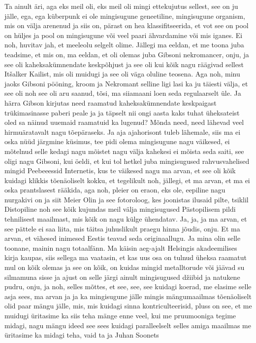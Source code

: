 Ta ainult äri, aga eks meil oli, eks meil oli mingi ettekujutus sellest, see on ju jälle, ega, ega küberpunk ei ole mingisugune geneetiline, mingisugune organism, mis on välja arenenud ja siis on, pärast on hea klassifitseerida, et vot see on pool on hüljes ja pool on mingisugune või veel paari ähvardamine või mis iganes. Ei noh, huvitav jah, et meeleolu selgelt olime. Jällegi ma eeldan, et me toona juba teadsime, et mis on, ma eeldan, et oli olemas juba Gibsoni nekromancer, onju, ja see oli kaheksakümnendate keskpõhjust ja see oli kui kõik nagu räägivad sellest Itšalker Kailist, mis oli muidugi ja see oli väga oluline teosena. Aga noh, minu jaoks Gibsoni pööning, kroom ja Nekromant selline ligi lasi ka ju täiesti välja, et see oli noh see oli aru saanud, tõsi, ma siiamaani loen seda regulaarselt üle. Ja härra Gibson kirjutas need raamatud kaheksakümnendate keskpaigast trükimasinasse paberi peale ja ja täpselt nii ongi aasta kaks tuhat üheksateist oled sa näinud uuemaid raamatuid ka lugenud? Mõnda need, need lähevad veel hirmuäratavalt nagu tõepäraseks. Ja aja ajahorisont tuleb lähemale, siis ma ei oska nüüd järgmine küsimus, tee pidi olema mingisugune nagu väikesed, ei mõtelnud selle kedagi nagu mõistet nagu välja kahekesi ei mõista seda saiti, see oligi nagu Gibsoni, kui öeldi, et kui tol hetkel juba mingisugused rahvusvahelised mingid Peebeeessid Internetis, kus te väikesed nagu ma arvan, et see oli kõik kuidagi klikkis tõenäoliselt kokku, et tegelikult noh, jällegi, et ma arvan, et ma ei oska prantslasest rääkida, aga noh, pleier on eraon, eks ole, eepiline nagu nurgakivi on ja siit Meier Olin ja see fotoroloog, kes joonistas ilusaid pilte, tsiklil Distopiline noh see kõik kujundas meil välja mingisugused Pästopilisem pildi tehnilisest maailmast, mis kõik on nagu külge ühendatav. Ja, ja, ja ma arvan, et see pättele ei saa liita, mis täitsa juhuslikult praegu hinna jõudis, onju. Et ma arvan, et vähesed inimesed Eestis teavad seda originaallugu. Ja mina olin selle toonane, mainin nagu totaalfänn. Ma käisin aeg-ajalt Helsingis akadeemilises kirja kaupas, siis sellega ma vaatasin, et kas uus osa on tulnud üheksa raamatut mul on kõik olemas ja see on kõik, on kuidas mingid metalltorude või jäävad su silmamuna sisse ja ajust on selle järgi ainult mingisugused džiibid ja natukene pudru, onju, ja noh, selles mõttes, et see, see, see kuidagi koerad, me elasime selle asja sees, ma arvan ja ja ka mingisugune jälle mingis mängumaailmas tõenäoliselt olid paar mängu jälle, mis, mis kuidagi sinna kontriculteerisid, pluss on see, et me muidugi üritasime ka siis teha mänge enne veel, kui me pruumooniga tegime midagi, nagu mängu ideed see sees kuidagi paralleelselt selles amiga maailmas me üritasime ka midagi teha, vaid ta ja Juhan Soonets
